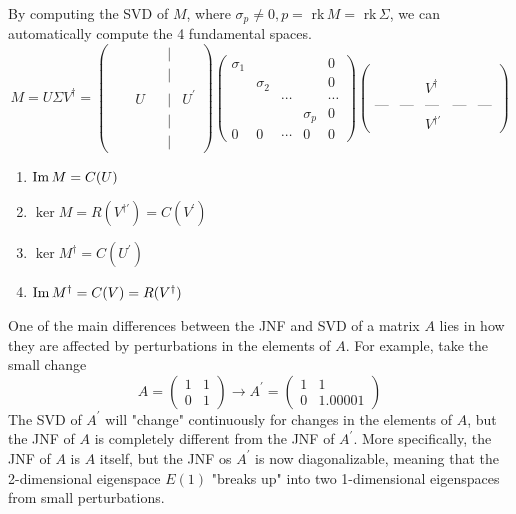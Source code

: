   By computing the SVD of $M$, where $\sigma_p \neq 0, p =$ rk$\,M = $ rk$\,\Sigma$, we can automatically compute the 4 fundamental spaces. 
  \begin{equation}
    M = U \Sigma V^\dagger = \begin{pmatrix}&&&&|&\\&&&&|&\\&&U&&|&U^\prime\\&&&&|&\\&&&&|&
    \end{pmatrix} \begin{pmatrix}
    \sigma_1&&&&0\\
    &\sigma_2&&&0\\
    &&\cdots&&\cdots\\
    &&&\sigma_p&0\\
    0&0&\cdots&0&0
    \end{pmatrix}\begin{pmatrix}
    &&&&\\&&&&\\&&V^\dagger&&\\&&&&\\\text{---}&\text{---}&\text{---}&\text{---}&\text{---}
    \\&&V^{\dagger \prime}&&
    \end{pmatrix}
  \end{equation}
  \begin{enumerate}
    \item $\operatorname{Im}{M} = C(U)$
    \item $\ker{M} = R(V^{\dagger \prime}) = C(V^\prime)$
    \item $\ker{M^\dagger} = C(U^\prime)$
    \item $\operatorname{Im}{M^\dagger} = C(V) = R(V^\dagger)$
  \end{enumerate}

  One of the main differences between the JNF and SVD of a matrix $A$ lies in how they are affected by perturbations in the elements of $A$. For example, take the small change 
  \begin{equation}
    A = \begin{pmatrix}
    1 & 1\\
    0 & 1
    \end{pmatrix} \to A^\prime  = \begin{pmatrix}
    1 & 1 \\
    0 & 1.00001
    \end{pmatrix}
  \end{equation}
  The SVD of $A^\prime$ will "change" continuously for changes in the elements of $A$, but the JNF of $A$ is completely different from the JNF of $A^\prime$. More specifically, the JNF of $A$ is $A$ itself, but the JNF os $A^\prime$ is now diagonalizable, meaning that the 2-dimensional eigenspace $E(1)$ "breaks up" into two 1-dimensional eigenspaces from small perturbations. 

